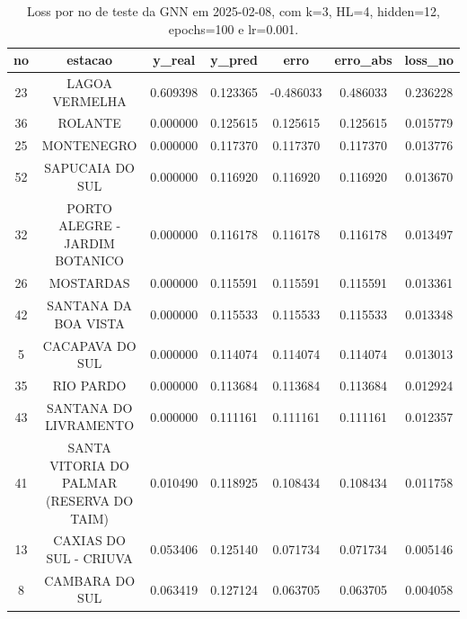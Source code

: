 \begin{table}[h]
\centering
\caption{Loss por no de teste da GNN em 2025-02-08, com k=3, HL=4, hidden=12, epochs=100 e lr=0.001.}
\label{tab:gnn_loss_k3_hl4_h12_e100_d20250208}
\begin{tabular}{ccccccc}
\toprule
no & estacao & y\_real & y\_pred & erro & erro\_abs & loss\_no \\
\midrule
23 & LAGOA VERMELHA & 0.609398 & 0.123365 & -0.486033 & 0.486033 & 0.236228 \\
36 & ROLANTE & 0.000000 & 0.125615 & 0.125615 & 0.125615 & 0.015779 \\
25 & MONTENEGRO & 0.000000 & 0.117370 & 0.117370 & 0.117370 & 0.013776 \\
52 & SAPUCAIA DO SUL & 0.000000 & 0.116920 & 0.116920 & 0.116920 & 0.013670 \\
32 & PORTO ALEGRE - JARDIM BOTANICO & 0.000000 & 0.116178 & 0.116178 & 0.116178 & 0.013497 \\
26 & MOSTARDAS & 0.000000 & 0.115591 & 0.115591 & 0.115591 & 0.013361 \\
42 & SANTANA DA BOA VISTA & 0.000000 & 0.115533 & 0.115533 & 0.115533 & 0.013348 \\
5 & CACAPAVA DO SUL & 0.000000 & 0.114074 & 0.114074 & 0.114074 & 0.013013 \\
35 & RIO PARDO & 0.000000 & 0.113684 & 0.113684 & 0.113684 & 0.012924 \\
43 & SANTANA DO LIVRAMENTO & 0.000000 & 0.111161 & 0.111161 & 0.111161 & 0.012357 \\
41 & SANTA VITORIA DO PALMAR (RESERVA DO TAIM) & 0.010490 & 0.118925 & 0.108434 & 0.108434 & 0.011758 \\
13 & CAXIAS DO SUL - CRIUVA & 0.053406 & 0.125140 & 0.071734 & 0.071734 & 0.005146 \\
8 & CAMBARA DO SUL & 0.063419 & 0.127124 & 0.063705 & 0.063705 & 0.004058 \\
\bottomrule
\end{tabular}
\end{table}
